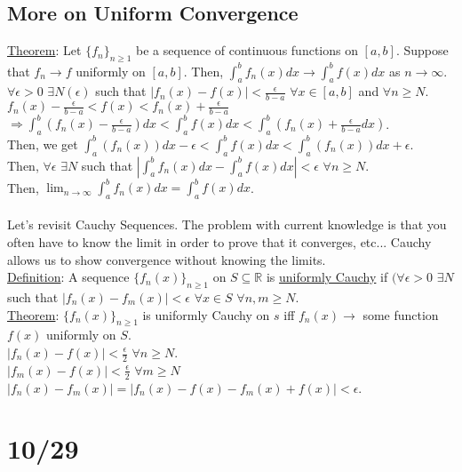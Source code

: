 \documentclass[11pt]{article}
\begin{document}
	\subsection*{More on Uniform Convergence}
	\underline{Theorem}: Let $\{f_n\}_{n \ge 1}$ be a sequence of continuous
	functions on $[a,b]$. Suppose that $f_n \to f$ uniformly on $[a,b]$. Then,
	$\int_a^b f_n(x) dx \to \int_a^b f(x) dx$ as $ n \to \infty$.\\
	$\forall \epsilon > 0$ $\exists N(\epsilon)$ such that $|f_n(x) - f(x)|
	< \frac{\epsilon}{b - a}$ $\forall x \in [a,b]$ and $ \forall n \ge N$.\\
	$f_n(x) - \frac{\epsilon}{b - a} < f(x) < f_n(x) + \frac{\epsilon}{b - a}$
	$\Rightarrow \int_a^b(f_n(x) - \frac{\epsilon}{b - a})dx < \int_a^b f(x) dx
	< \int_a^b(f_n(x) + \frac{\epsilon}{b - a}dx)$.\\
	Then, we get $\int_a^b(f_n(x))dx - \epsilon < \int_a^b f(x) dx < 
	\int_a^b(f_n(x))dx + \epsilon $.\\
	Then, $\forall \epsilon$ $\exists N$ such that $|\int_a^b f_n(x)dx - 
	\int_a^b f(x)dx| < \epsilon$ $\forall n \ge N$.\\
	Then, $\lim_{n \to \infty}{\int_a^b f_n(x)dx} = \int_a^b f(x)dx$.\\\\
%
	Let's revisit Cauchy Sequences. The problem with current knowledge is
	that you often have to know the limit in order to prove that it
	converges, etc... Cauchy allows us to show convergence without knowing
	the limits.\\
	\underline{Definition}: A sequence $\{f_n(x)\}_{n \ge 1}$ on $S \subseteq
	\mathbb{R}$ is \underline{uniformly Cauchy} if $(\forall \epsilon > 0$ 
	$\exists N$ such that $|f_n(x) - f_m(x)| < \epsilon$ $\forall x \in S$ 
	$\forall n,m \ge N$.\\
	\underline{Theorem}: $\{f_n(x)\}_{n \ge 1}$ is uniformly Cauchy on $s$
	iff $f_n(x) \to $ some function $f(x)$ uniformly on $S$.\\
	$|f_n(x) - f(x)| < \frac{\epsilon}{2}$ $\forall n \ge N$.\\
	$|f_m(x) - f(x)| < \frac{\epsilon}{2}$ $\forall m \ge N$\\
	$|f_n(x) - f_m(x)| = |f_n(x) - f(x) - f_m(x) + f(x)| < \epsilon$.

\section*{10/29}
\end{document}
